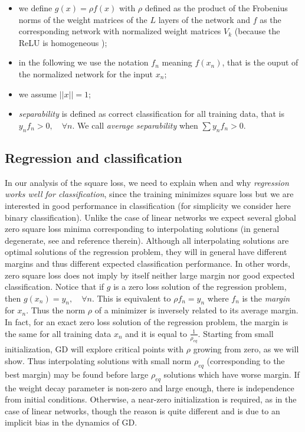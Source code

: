 \documentclass[11pt]{article}
\begin{document}
\begin{itemize}

\item we define $g(x)=\rho f(x)$ with $\rho$ defined as the product
  of the Frobenius norms of the weight matrices of the $L$ layers of
  the network and $f$ as the corresponding network with normalized
  weight matrices $V_k$ (because the ReLU is homogeneous
  \cite{theory_III});
\item in the following we use the notation $f_n$ meaning $f(x_n)$,
  that is the ouput of the normalized
  network for the input $x_n$;
\item we assume $||x||=1$;

\item {\it separability} is defined as correct classification for all
  training data, that is $y_n f_n>0,\quad \forall n$. We call {\it
    average separability} when $\sum y_nf_n>0$.
        


\end{itemize}

\subsection{Regression and classification}

In our analysis of the square loss, we need to explain when and why
{\it regression works well for classification}, since the training minimizes
square loss but we are interested in good performance in
classification (for simplicity we consider here binary
classification).  Unlike the case of linear networks we expect several
global zero square loss minima corresponding to interpolating
solutions (in general degenerate, see \cite{PoggioCooper} and
reference therein). Although all interpolating solutions are optimal
solutions of the regression problem, they will in general have
different margins and thus different expected classification
performance. In other words, zero square loss does not imply by itself
neither large margin nor good expected classification. Notice that if
$g$ is a zero loss solution of the regression problem, then
$g(x_n)=y_n, \quad \forall n$. This is equivalent to $\rho f_n=y_n$
where $f_n$ is the {\it margin} for $x_n$. Thus the norm $\rho$ of a
minimizer is inversely related to its average margin. In fact, for an
exact zero loss solution of the regression problem, the margin is the
same for all training data $x_n$ and it is equal to
$\frac{1}{\rho_{eq}}$. Starting from small initialization, GD will
explore critical points with $\rho$ growing from zero, as we will
show. Thus interpolating solutions with small norm $\rho_{eq}$
(corresponding to the best margin) may be found before large
$\rho_{eq}$ solutions which have worse margin. If the weight decay
parameter is non-zero and large enough, there is independence from initial
conditions. Otherwise, a near-zero initialization is required, as in the
case of linear networks, though the reason is quite different and is
due to an implicit bias in the dynamics of GD.
\end{document}
